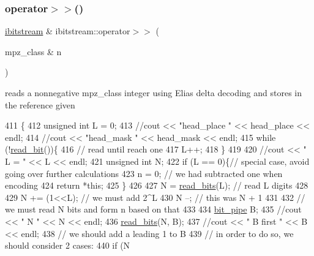\subsubsection{\texorpdfstring{operator$>$$>$()}{operator>>()}\hspace{0.1cm}{\footnotesize\ttfamily [2/2]}}
{\footnotesize\ttfamily \hyperlink{classibitstream}{ibitstream} \& ibitstream\+::operator$>$$>$ (\begin{DoxyParamCaption}\item[{mpz\+\_\+class \&}]{n }\end{DoxyParamCaption})}



reads a nonnegative mpz\+\_\+class integer using Elias delta decoding and stores in the reference given 


\begin{DoxyCode}
411                                                 \{
412   \textcolor{keywordtype}{unsigned} \textcolor{keywordtype}{int} L = 0;
413   \textcolor{comment}{//cout << "head\_place " << head\_place << endl;}
414   \textcolor{comment}{//cout << "head\_mask  " << head\_mask << endl;}
415   \textcolor{keywordflow}{while} (!\hyperlink{classibitstream_a895239acf7179f6778388c39c97643e4}{read\_bit}())\{
416     \textcolor{comment}{// read until reach one}
417     L++;
418   \}
419 
420   \textcolor{comment}{//cout << " L = " << L << endl;}
421   \textcolor{keywordtype}{unsigned} \textcolor{keywordtype}{int} N;
422   \textcolor{keywordflow}{if} (L == 0)\{\textcolor{comment}{// special case, avoid going over further calculations}
423     n = 0; \textcolor{comment}{// we had subtracted one when encoding }
424     \textcolor{keywordflow}{return} *\textcolor{keyword}{this};
425   \}
426 
427   N = \hyperlink{classibitstream_a2fdcaecf10fefa6942dcd5286a2696e0}{read\_bits}(L); \textcolor{comment}{// read L digits}
428   
429   N += (1<<L); \textcolor{comment}{// we must add 2^L}
430   N --; \textcolor{comment}{// this was N + 1}
431 
432   \textcolor{comment}{// we must read N bits and form n based on that}
433 
434   \hyperlink{classbit__pipe}{bit\_pipe} B;
435   \textcolor{comment}{//cout << " N " << N << endl;}
436   \hyperlink{classibitstream_a2fdcaecf10fefa6942dcd5286a2696e0}{read\_bits}(N, B);
437   \textcolor{comment}{//cout << " B first " << B << endl;}
438   \textcolor{comment}{// we should add a leading 1 to B}
439   \textcolor{comment}{// in order to do so, we should consider 2 cases:}
440   \textcolor{keywordflow}{if} (N %

\end{DoxyCode}
